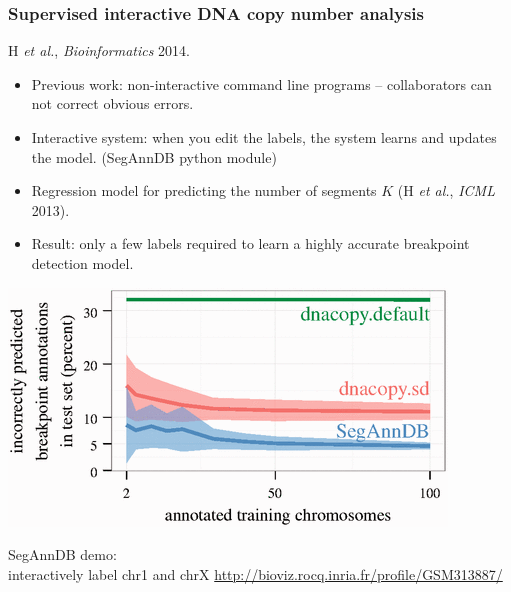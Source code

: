 \documentclass{beamer}
\begin{document}
\begin{frame}
  \frametitle{Supervised interactive DNA copy number analysis}
  H {\it et al.}, {\it Bioinformatics} 2014.

  \begin{itemize}
  \item Previous work: non-interactive command line programs
    -- collaborators can not correct obvious
    errors.
  \item Interactive system: when you edit the labels, the system
    learns and updates the model. (SegAnnDB python module)
  \item Regression model for predicting the number of segments $K$ (H
    {\it et al.}, {\it ICML} 2013).
  \item Result: only a few labels required to learn a highly accurate
    breakpoint detection model.
  \end{itemize}
  \begin{minipage}{0.5\linewidth}
    \includegraphics[width=\textwidth]{SegAnnDB-test-error-decreases}
  \end{minipage}
  \begin{minipage}[0.5\linewidth]{0.48\linewidth}
SegAnnDB demo:\\interactively label chr1 and chrX
  \url{http://bioviz.rocq.inria.fr/profile/GSM313887/}
  \end{minipage}
\end{frame}
\end{document}
